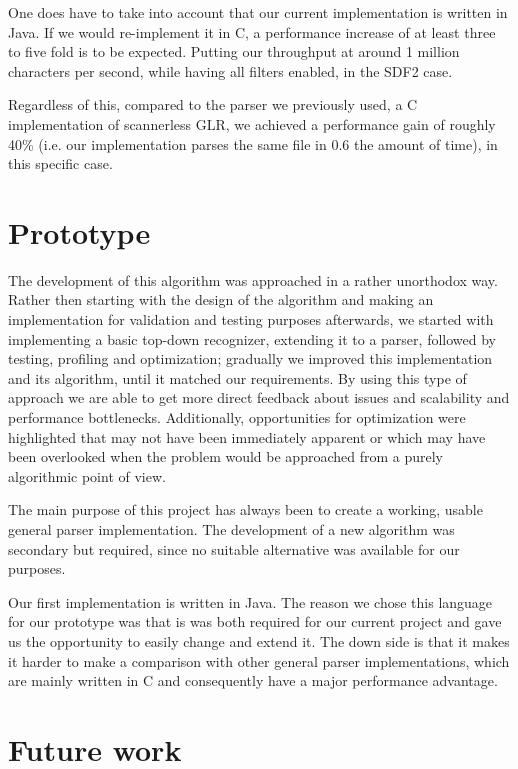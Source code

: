 \documentclass[a4paper,10pt]{article}
\begin{document}
One does have to take into account that our current implementation is written in Java. If we would re-implement it in C, a performance increase of at least three to five fold is to be expected. Putting our throughput at around 1 million characters per second, while having all filters enabled, in the SDF2 case.

Regardless of this, compared to the parser we previously used, a C implementation of scannerless GLR, we achieved a performance gain of roughly 40\% (i.e. our implementation parses the same file in 0.6 the amount of time), in this specific case.

\section{Prototype}

The development of this algorithm was approached in a rather unorthodox way. Rather then starting with the design of the algorithm and making an implementation for validation and testing purposes afterwards, we started with implementing a basic top-down recognizer, extending it to a parser, followed by testing, profiling and optimization; gradually we improved this implementation and its algorithm, until it matched our requirements. By using this type of approach we are able to get more direct feedback about issues and scalability and performance bottlenecks. Additionally, opportunities for optimization were highlighted that may not have been immediately apparent or which may have been overlooked when the problem would be approached from a purely algorithmic point of view.

The main purpose of this project has always been to create a working, usable general parser implementation. The development of a new algorithm was secondary but required, since no suitable alternative was available for our purposes.

Our first implementation is written in Java. The reason we chose this language for our prototype was that is was both required for our current project and gave us the opportunity to easily change and extend it. The down side is that it makes it harder to make a comparison with other general parser implementations, which are mainly written in C and consequently have a major performance advantage.

\section{Future work}
\end{document}
